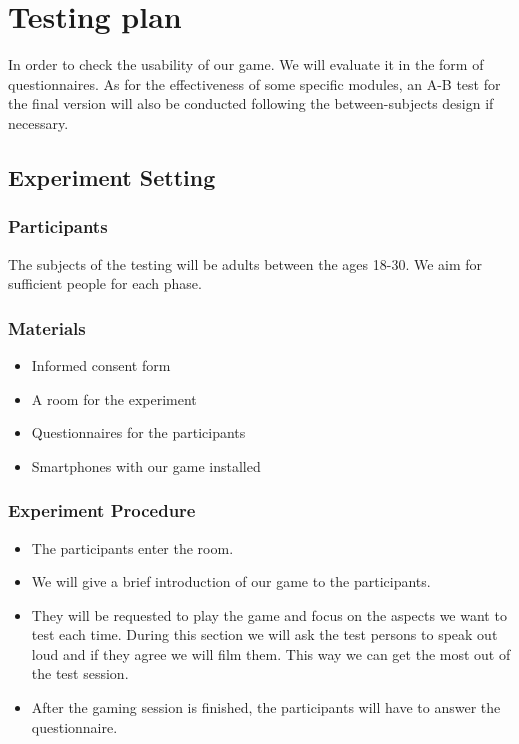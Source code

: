 \documentclass[a4paper,11pt,notitlepage]{report}
\begin{document}
\section{Testing plan}
In order to check the usability of our game. We will evaluate it in the form of questionnaires. As for the effectiveness of some specific modules, an A-B test for the final version will also be conducted following the between-subjects design if necessary.

\subsection{Experiment Setting}
\subsubsection{Participants}
The subjects of the testing will be adults between the ages 18-30. We aim for sufficient people for each phase.
\subsubsection{Materials}
\begin{itemize}
\item Informed consent form
\item A room for the experiment
\item Questionnaires for the participants
\item Smartphones with our game installed
\end{itemize}
\subsubsection{Experiment Procedure}
\begin{itemize}
\item The participants enter the room.
\item We will give a brief introduction of our game to the participants.
\item They will be requested to play the game  and focus on the aspects we want to test each time. During this section we will ask the test persons to speak out loud and if they agree we will film them. This way we can get the most out of the test session.
\item After the gaming session is finished, the participants will have to answer the questionnaire.
\end{itemize}
\end{document}
